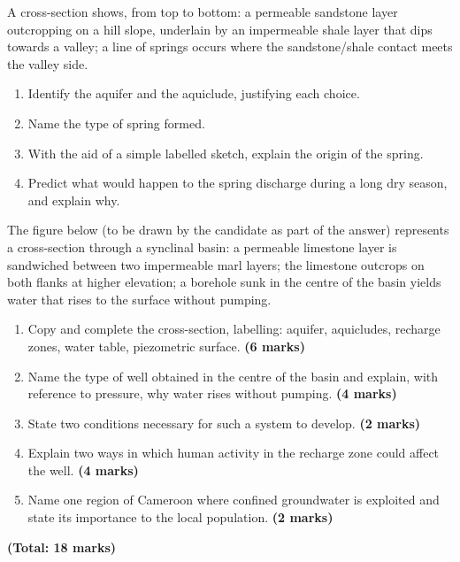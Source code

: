 \documentclass[11pt]{article}
\newcounter{popsec}
\newcounter{popsub}
\newcommand{\courssub}[1]{%
  \stepcounter{popsub}%
  \par\vspace{9pt}\noindent{\popxbold\fontsize{11.5}{13}\selectfont\color{popink}{\color{poporange}\thepopsec.\thepopsub}\hspace{6pt}#1}\par\nopagebreak\vspace{4pt}
}
\begin{document}
\begin{exercice}
A cross-section shows, from top to bottom: a permeable sandstone layer outcropping on a hill slope, underlain by an impermeable shale layer that dips towards a valley; a line of springs occurs where the sandstone/shale contact meets the valley side.
\begin{enumerate}
\item Identify the aquifer and the aquiclude, justifying each choice.
\item Name the type of spring formed.
\item With the aid of a simple labelled sketch, explain the origin of the spring.
\item Predict what would happen to the spring discharge during a long dry season, and explain why.
\end{enumerate}
\end{exercice}

\courssub{I prepare for the GCE}

\begin{exercice}
The figure below (to be drawn by the candidate as part of the answer) represents a cross-section through a synclinal basin: a permeable limestone layer is sandwiched between two impermeable marl layers; the limestone outcrops on both flanks at higher elevation; a borehole sunk in the centre of the basin yields water that rises to the surface without pumping.

\begin{enumerate}
\item Copy and complete the cross-section, labelling: aquifer, aquicludes, recharge zones, water table, piezometric surface. \textbf{(6 marks)}
\item Name the type of well obtained in the centre of the basin and explain, with reference to pressure, why water rises without pumping. \textbf{(4 marks)}
\item State two conditions necessary for such a system to develop. \textbf{(2 marks)}
\item Explain two ways in which human activity in the recharge zone could affect the well. \textbf{(4 marks)}
\item Name one region of Cameroon where confined groundwater is exploited and state its importance to the local population. \textbf{(2 marks)}
\end{enumerate}
\textbf{(Total: 18 marks)}
\end{exercice}
\end{document}
